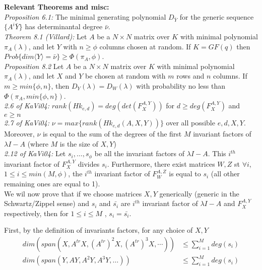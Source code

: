 \documentclass[12pt]{article}
\begin{document}
	
\noindent\textbf{Relevant Theorems and misc:}\\
\noindent\textit{Proposition 6.1:} The minimal generating polynomial $D_{\bar{Y}}$ for the generic
sequence $\{A^i\bar{Y}\}$ has determinantal degree $\bar{\nu}$.\\

\noindent\textit{Theorem 8.1 (Villard):} Let $A$ be a $N \times N$ matrix over $K$ with minimal polynomial $\pi_A(\lambda)$,
and let $Y$ with $n \ge \phi$ columns chosen at random. If $K = GF(q)$ then $Prob\{dim \langle Y \rangle = \bar{\nu} \} \ge
\Phi(\pi_A,\phi)$.\\

\noindent\textit{Proposition 8.2} Let $A$ be a $N \times N$ matrix over $K$ with minimal polynomial $\pi_A(\lambda)$,
and let $X$ and $Y$ be chosen at random with $m$ rows and $n$ columns. If $m \ge min\{\phi,n\}$, then $D_Y(\lambda) = D_W(\lambda)$
with probability no less than $\Phi(\pi_A,min\{\phi,n\})$.\\

\noindent\textit{2.6 of KaVi04:} $rank(Hk_{e,d}) = deg(det(F_X^{A,Y}))$ for $d \ge deg(F_X^{A,Y})$ and $e \ge n$\\

\noindent\textit{2.7 of KaVi04:} $\nu = max\{ rank(Hk_{e,d}(A,X,Y))\}$ over all possible $e,d,X,Y$. Moreover, $\nu$ is equal to the sum of the
degrees of the first $M$ invariant factors of $\lambda I -A$ (where $M$ is the size of $X,Y$)\\

\noindent\textit{2.12 of KaVi04:} Let $s_i,\dots, s_\phi$ be all the invariant factors of $\lambda I - A$. This $i^{th}$ invariant factor of
$F_X^{A,Y}$ divides $s_i$. Furthermore, there exist matrices $W,Z$ st $\forall i$, $1 \le i \le min(M,\phi)$, the $i^{th}$ invariant factor of
$F_W^{A,Z}$ is equal to $s_i$ (all other remaining ones are equal to 1).\\

\noindent We wil now prove that if we choose matrices $X,Y$ generically (generic in the 
Schwartz/Zippel sense) and $s_i$ and $\bar{s_i}$ are $i^{th}$ invariant factor of 
$\lambda I - A$ and $F_X^{A,Y}$ respectively, then for $1 \le i \le M$ ,
$s_i = \bar{s_i}$.

\noindent First, by the definition of invariants factors, for any choice of $X,Y$
\begin{align*}
	dim(span(X,A^{tr}X,(A^{tr})^2X, (A^{tr})^3X,\cdots)) &\le \sum_{i=1}^{M} deg(s_i)\\
	dim(span(Y,AY,A^2Y,A^3Y,\dots)) &\le \sum_{i=1}^{M} deg(s_i)
\end{align*}
\end{document}

